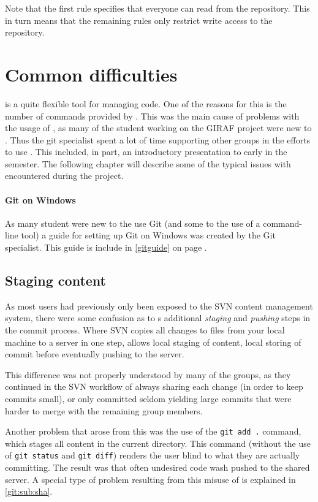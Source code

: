Note that the first rule specifies that everyone can read from the repository.
This in turn means that the remaining rules only restrict write access to the repository.

\section{Common \git{} difficulties}
\Git{} is a quite flexible tool for managing code.
One of the reasons for this is the number of commands provided by \git{}.
This was the main cause of problems with the usage of \git{}, as many of the student working on the GIRAF project were new to \git{}.
Thus the git specialist spent a lot of time supporting other groups in the efforts to use \git{}.
This included, in part, an introductory presentation to \git{} early in the semester.
The following chapter will describe some of the typical issues with \git{} encountered during the project.

\paragraph{Git on Windows}
As many student were new to the use Git (and some to the use of a command-line tool) a guide for setting up Git on Windows was created by the Git specialist.
This guide is include in \cref{gitguide} on page \pageref{gitguide}.

\subsection{Staging content}
As most users had previously only been exposed to the SVN content management system, there were some confusion as to \git{}s additional \textit{staging} and \textit{pushing} steps in the commit process.
Where SVN copies all changes to files from your local machine to a server in one step, \git{} allows local staging of content, local storing of commit before eventually pushing to the server.

This difference was not properly understood by many of the groups, as they continued in the SVN workflow of always sharing each change (in order to keep commits small), or only committed seldom yielding large commits that were harder to merge with the remaining group members.

Another problem that arose from this was the use of the \texttt{git add .} command, which stages all content in the current directory.
This command (without the use of \texttt{git status} and \texttt{git diff}) renders the user blind to what they are actually committing.
The result was that often undesired code wash pushed to the shared server.
A special type of problem resulting from this misuse of \git{} is explained in \cref{git:sub:sha}.

